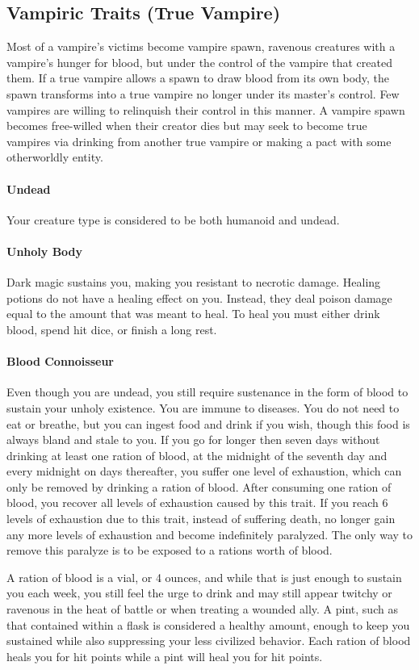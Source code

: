 \documentclass[letterpaper,openany,oneside,twocolumn]{book}
\begin{document}
\subsection*{Vampiric Traits (True Vampire)}
Most of a vampire's victims become vampire spawn, ravenous creatures with a vampire's hunger for blood, but under the control of the vampire that created them. If a true vampire allows a spawn to draw blood from its own body, the spawn transforms into a true vampire no longer under its master's control. Few vampires are willing to relinquish their control in this manner. A vampire spawn becomes free-willed when their creator dies but may seek to become true vampires via drinking from another true vampire or making a pact with some otherworldly entity.
\paragraph*{Undead}
Your creature type is considered to be both humanoid and undead.
\paragraph*{Unholy Body}
Dark magic sustains you, making you resistant to necrotic damage. Healing potions do not have a healing effect on you. Instead, they deal poison damage equal to the amount that was meant to heal. To heal you must either drink blood, spend hit dice, or finish a long rest.
\paragraph*{Blood Connoisseur}
Even though you are undead, you still require sustenance in the form of blood to sustain your unholy existence. You are immune to diseases. You do not need to eat or breathe, but you can ingest food and drink if you wish, though this food is always bland and stale to you. If you go for longer then seven days without drinking at least one ration of blood, at the midnight of the seventh day and every midnight on days thereafter, you suffer one level of exhaustion, which can only be removed by drinking a ration of blood. After consuming one ration of blood, you recover all levels of exhaustion caused by this trait. If you reach 6 levels of exhaustion due to this trait, instead of suffering death, no longer gain any more levels of exhaustion and become indefinitely paralyzed. The only way to remove this paralyze is to be exposed to a rations worth of blood.

A ration of blood is a vial, or 4 ounces, and while that is just enough to sustain you each week, you still feel the urge to drink and may still appear twitchy or ravenous in the heat of battle or when treating a wounded ally. A pint, such as that contained within a flask is considered a healthy amount, enough to keep you sustained while also suppressing your less civilized behavior. Each ration of blood heals you for  hit points while a pint will heal you for  hit points.
\end{document}
